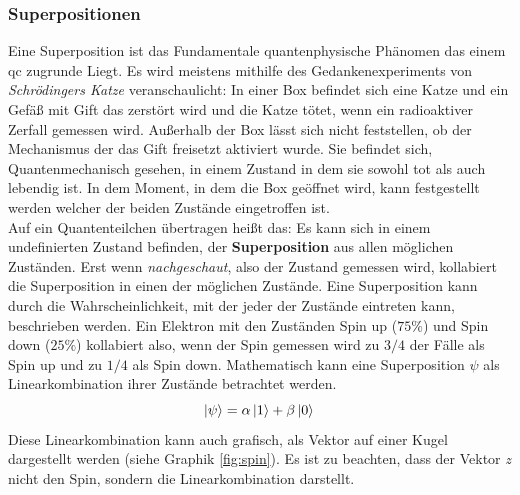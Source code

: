 \subsubsection{Superpositionen}
Eine Superposition ist das Fundamentale quantenphysische Phänomen das einem \ac{qc} zugrunde Liegt.
Es wird meistens mithilfe des Gedankenexperiments von \cite[\$5]{schrodinger_gegenwartige_1935} \textit{Schrödingers Katze} veranschaulicht: In einer Box befindet sich eine Katze und ein Gefäß mit Gift das zerstört wird und die Katze tötet, wenn ein radioaktiver Zerfall gemessen wird. Außerhalb der Box lässt sich nicht feststellen, ob der Mechanismus der das Gift freisetzt aktiviert wurde. Sie befindet sich, Quantenmechanisch gesehen, in einem Zustand in dem sie sowohl tot als auch lebendig ist. In dem Moment, in dem die Box geöffnet wird, kann festgestellt werden welcher der beiden Zustände eingetroffen ist.\\
Auf ein Quantenteilchen übertragen heißt das: Es kann sich in einem undefinierten Zustand befinden, der \textbf{Superposition} aus allen möglichen Zuständen. Erst wenn \textit{nachgeschaut}, also der Zustand gemessen wird, kollabiert die Superposition in einen der möglichen Zustände. Eine Superposition kann durch die Wahrscheinlichkeit, mit der jeder der Zustände eintreten kann, beschrieben werden. Ein Elektron mit den Zuständen Spin up ($75\%$) und Spin down ($25\%$) kollabiert also, wenn der Spin gemessen wird zu $3/4$ der Fälle als Spin up und zu $1/4$ als Spin down.
Mathematisch kann eine Superposition $\psi$ als Linearkombination ihrer Zustände betrachtet werden. 
\begin{equation}
    \ket{\psi } = \alpha \ket{1} + \beta \ket{0} \\
\end{equation}
Diese Linearkombination kann auch grafisch, als Vektor auf einer Kugel dargestellt werden (siehe Graphik \ref{fig:spin}). Es ist zu beachten, dass der Vektor \textit{z} nicht den Spin, sondern die Linearkombination darstellt.

